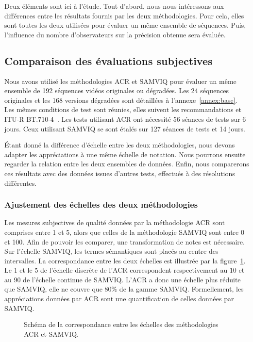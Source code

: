 Deux éléments sont ici à l'étude. Tout d'abord, nous nous intéressons aux différences entre les résultats fournis par les deux méthodologies. Pour cela, elles sont toutes les deux utilisées pour évaluer un même ensemble de séquences. Puis, l'influence du nombre d'observateurs sur la précision obtenue sera évaluée.


\subsection{Comparaison des évaluations subjectives}
Nous avons utilisé les méthodologies ACR et SAMVIQ pour évaluer un même ensemble de 192 séquences vidéos originales ou dégradées. Les 24 séquences originales et les 168 versions dégradées sont détaillées à l'annexe~\ref{annex:base}. Les mêmes conditions de test sont réunies, elles suivent les recommandations \ituCC{} et ITU-R BT.710-4~\cite{itu-bt710-4}. Les tests utilisant ACR ont nécessité 56 séances de tests sur 6 jours. Ceux utilisant SAMVIQ se sont étalés sur 127 séances de tests et 14 jours.

Étant donné la différence d'échelle entre les deux méthodologies, nous devons adapter les appréciations à une même échelle de notation. Nous pourrons ensuite regarder la relation entre les deux ensembles de données. Enfin, nous comparerons ces résultats avec des données issues d'autres tests, effectués à des résolutions différentes.


\subsubsection{Ajustement des échelles des deux méthodologies}
Les mesures subjectives de qualité données par la méthodologie ACR sont comprises entre 1 et 5, alors que celles de la méthodologie SAMVIQ sont entre 0 et 100. Afin de pouvoir les comparer, une transformation de notes est nécessaire. Sur l'échelle SAMVIQ, les termes sémantiques sont placés au centre des intervalles. La correspondance entre les deux échelles est illustrée par la figure~\ref{fig:diffEchelleACR-SAMVIQ}. Le 1 et le 5 de l'échelle discrète de l'ACR correspondent respectivement au 10 et au 90 de l'échelle continue de SAMVIQ. L'ACR a donc une échelle plus réduite que SAMVIQ, elle ne couvre que 80\% de la gamme SAMVIQ. Formellement, les appréciations données par ACR sont une quantification de celles données par SAMVIQ.

\begin{figure}[htbp]
  \centering
  
  \caption{Schéma de la correspondance entre les échelles des méthodologies ACR et SAMVIQ.}
  \label{fig:diffEchelleACR-SAMVIQ}
\end{figure}

